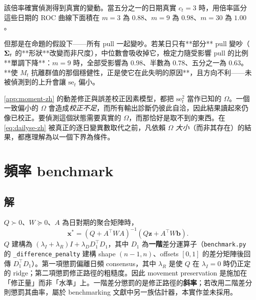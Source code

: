 \documentclass[12pt,a4paper,oneside]{article}
\begin{document}
\begin{remark}\label{rem:localpower-zh}
該倍率確實偵測得到真實的變動。當五分之一的日期真實 $c_t=3$ 時，用倍率區分這些日期的 ROC 曲線下面積在 $m=3$ 為 $0.88$、$m=9$ 為 $0.98$、$m=30$ 為 $1.00$。

但那是在命題的假設下——所有 pull 一起變吵。若某日只有**部分** pull 變吵（$\bm{\Sigma}_t$ 的**形狀**改變而非尺度），中位數會吸收掉它，檢定力隨受影響 pull 的比例**單調下降**：$m=9$ 時，全部受影響為 $0.98$、半數為 $0.78$、五分之一為 $0.63$。**使 $M_t$ 抗離群值的那個穩健性，正是使它在此失明的原因**，且方向不利——未被偵測到的上升會讓 $\mathrm{se}_t$ 偏小。
\end{remark}

\begin{remark}[對誤差修正估計量的後果]
\cref{app:moment-zh} 的動差修正與誤差校正因素模型，都把 $\mathrm{se}_t^2$ 當作已知的 $\Omega$。一個一致偏小的 $\Omega$ 會造成\emph{校正不足}，而所有輸出診斷仍彼此自洽，因此結果讀起來仍像已校正。要偵測這個狀態需要真實的 $\Omega$，而那恰好是取不到的東西。在 \eqref{eq:dailyse-zh} 被真正的逐日變異數取代之前，凡依賴 $\Omega$ \emph{大小}（而非其存在）的結果，都應理解為以一個下界為條件。
\end{remark}

\section{頻率 benchmark}

\subsection{解}

$Q\succ 0$、$W\succeq 0$、$A$ 為日對期的聚合矩陣時，
\begin{equation}
\bm{x}^*=(Q+A^\top WA)^{-1}(Q\bm{z}+A^\top W\bm{b}).
\end{equation}
$Q$ 建構為 $(\lambda_I+\lambda_R)I+\lambda_D D_1^\top D_1$，其中 $D_1$ 為\textbf{一階}差分運算子（\texttt{benchmark.py} 的 \texttt{\_difference\_penalty} 建構 shape $(n-1,n)$、offsets $[0,1]$ 的差分矩陣後回傳 $D_1^\top D_1$）。第一項懲罰偏離日頻 consensus，其中 $\lambda_R$ 是使 $Q$ 在 $\lambda_I=0$ 時仍正定的 ridge；第二項懲罰修正路徑的粗糙度。因此 movement preservation 是施加在「修正量」而非「水準」上。一階差分懲罰的是修正路徑的\textbf{斜率}；若改用二階差分則懲罰其曲率，屬於 benchmarking 文獻中另一族估計器，本實作並未採用。
\end{document}
